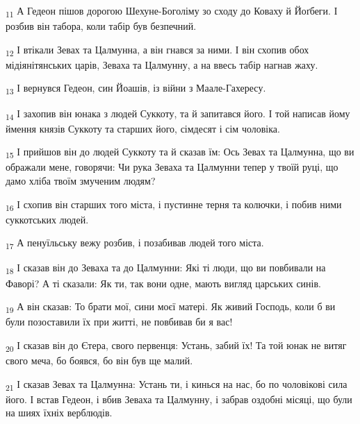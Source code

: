 \begin{tcolorbox}
\textsubscript{11} А Гедеон пішов дорогою Шехуне-Боголіму зо сходу до Коваху й Йоґбеги. І розбив він табора, коли табір був безпечний.
\end{tcolorbox}
\begin{tcolorbox}
\textsubscript{12} І втікали Зевах та Цалмунна, а він гнався за ними. І він схопив обох мідіянітянських царів, Зеваха та Цалмунну, а на ввесь табір нагнав жаху.
\end{tcolorbox}
\begin{tcolorbox}
\textsubscript{13} І вернувся Гедеон, син Йоашів, із війни з Маале-Гахересу.
\end{tcolorbox}
\begin{tcolorbox}
\textsubscript{14} І захопив він юнака з людей Суккоту, та й запитався його. І той написав йому ймення князів Суккоту та старших його, сімдесят і сім чоловіка.
\end{tcolorbox}
\begin{tcolorbox}
\textsubscript{15} І прийшов він до людей Суккоту та й сказав їм: Ось Зевах та Цалмунна, що ви ображали мене, говорячи: Чи рука Зеваха та Цалмунни тепер у твоїй руці, що дамо хліба твоїм змученим людям?
\end{tcolorbox}
\begin{tcolorbox}
\textsubscript{16} І схопив він старших того міста, і пустинне терня та колючки, і побив ними суккотських людей.
\end{tcolorbox}
\begin{tcolorbox}
\textsubscript{17} А пенуїльську вежу розбив, і позабивав людей того міста.
\end{tcolorbox}
\begin{tcolorbox}
\textsubscript{18} І сказав він до Зеваха та до Цалмунни: Які ті люди, що ви повбивали на Фаворі? А ті сказали: Як ти, так вони одне, мають вигляд царських синів.
\end{tcolorbox}
\begin{tcolorbox}
\textsubscript{19} А він сказав: То брати мої, сини моєї матері. Як живий Господь, коли б ви були позоставили їх при житті, не повбивав би я вас!
\end{tcolorbox}
\begin{tcolorbox}
\textsubscript{20} І сказав він до Єтера, свого первенця: Устань, забий їх! Та той юнак не витяг свого меча, бо боявся, бо він був ще малий.
\end{tcolorbox}
\begin{tcolorbox}
\textsubscript{21} І сказав Зевах та Цалмунна: Устань ти, і кинься на нас, бо по чоловікові сила його. І встав Гедеон, і вбив Зеваха та Цалмунну, і забрав оздобні місяці, що були на шиях їхніх верблюдів.
\end{tcolorbox}
